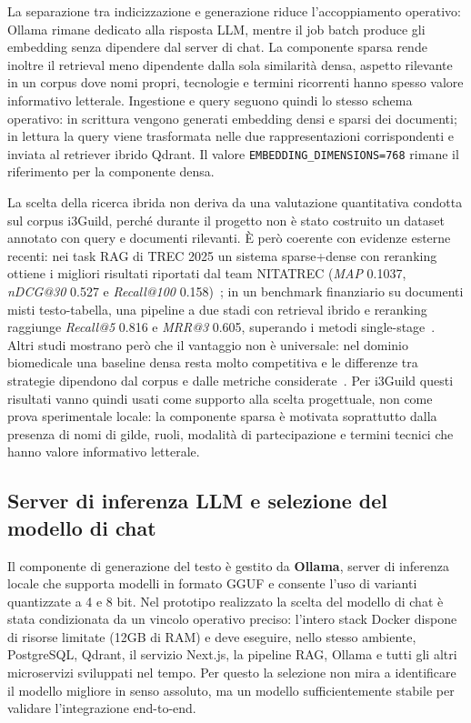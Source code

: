 \noindent La separazione tra indicizzazione e generazione riduce
l'accoppiamento operativo: Ollama rimane dedicato alla risposta LLM, mentre il
job batch produce gli embedding senza dipendere dal server di chat. La
componente sparsa rende inoltre il retrieval meno dipendente dalla sola
similarità densa, aspetto rilevante in un corpus dove nomi propri, tecnologie e
termini ricorrenti hanno spesso valore informativo letterale. Ingestione e query
seguono quindi lo stesso schema operativo: in scrittura vengono generati
embedding densi e sparsi dei documenti; in lettura la query viene trasformata
nelle due rappresentazioni corrispondenti e inviata al retriever ibrido Qdrant.
Il valore
\texttt{EMBEDDING\_DIMENSIONS=768} rimane il riferimento per la componente
densa.

La scelta della ricerca ibrida non deriva da una valutazione quantitativa
condotta sul corpus i3Guild, perché durante il progetto non è stato costruito
un dataset annotato con query e documenti rilevanti. È però coerente con
evidenze esterne recenti: nei task RAG di TREC 2025 un sistema sparse+dense con
reranking ottiene i migliori risultati riportati dal team NITATREC
(\textit{MAP} 0.1037, \textit{nDCG@30} 0.527 e \textit{Recall@100}
0.158)~\cite{sinha2025nitatrec}; in un benchmark finanziario su documenti misti
testo-tabella, una pipeline a due stadi con retrieval ibrido e reranking
raggiunge \textit{Recall@5} 0.816 e \textit{MRR@3} 0.605, superando i metodi
single-stage~\cite{akarsu2026bm25correctiverag}. Altri studi mostrano però che
il vantaggio non è universale: nel dominio biomedicale una baseline densa resta
molto competitiva e le differenze tra strategie dipendono dal corpus e dalle
metriche considerate~\cite{bal2026biomedicalretrieval}. Per i3Guild questi
risultati vanno quindi usati come supporto alla scelta progettuale, non come
prova sperimentale locale: la componente sparsa è motivata soprattutto dalla
presenza di nomi di gilde, ruoli, modalità di partecipazione e termini tecnici
che hanno valore informativo letterale.

\subsection{Server di inferenza LLM e selezione del modello di chat}
\label{subsec:llm_choice}

Il componente di generazione del testo è gestito da \textbf{Ollama}, server di
inferenza locale che supporta modelli in formato GGUF e consente l'uso di
varianti quantizzate a 4 e 8 bit. Nel prototipo realizzato la scelta del modello
di chat è stata condizionata da un vincolo operativo preciso: l'intero stack
Docker dispone di risorse limitate (12GB di RAM) e deve eseguire, nello stesso ambiente,
PostgreSQL, Qdrant, il servizio Next.js, la pipeline RAG, Ollama e tutti gli altri microservizi sviluppati nel tempo. 
Per questo la selezione non mira a identificare il modello migliore in senso assoluto, ma
un modello sufficientemente stabile per validare l'integrazione end-to-end.

